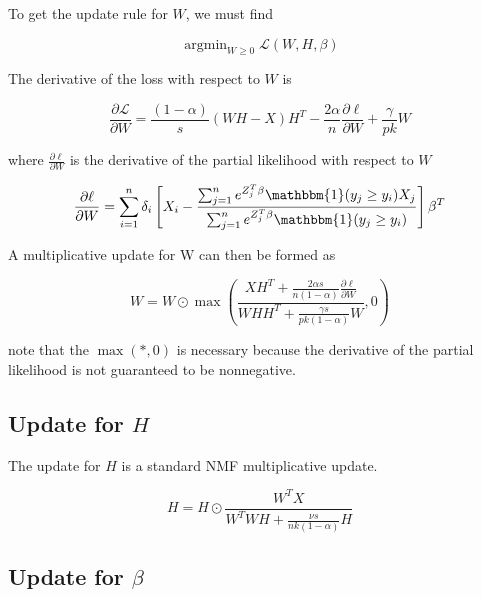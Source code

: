 \documentclass[9pt,twocolumn,twoside,]{pnas-new}
\begin{document}
To get the update rule for \(W\), we must find

\begin{equation}
    \mathop{\mathrm{argmin}}_{W \geq 0} \mathcal{L}(W,H,\beta)
\end{equation}

The derivative of the loss with respect to \(W\) is

\begin{equation}
        \frac{\partial \mathcal{L}}{\partial W} = \frac{(1-\alpha)}{s} (WH-X)H^T - \frac{2\alpha}{n}\frac{\partial \ell}{\partial W} + \frac{\gamma}{pk}W
\end{equation}

where \(\frac{\partial \ell}{\partial W}\) is the derivative of the
partial likelihood with respect to \(W\)

\begin{equation}
    \frac{\partial \ell}{\partial W} = \sum_{i=1}^n \delta_i \left[X_i - \frac{\sum_{j=1}^n e^{Z_j^T\beta} \mathbbm{1} (y_j \geq y_i)X_j}{\sum_{j=1}^n e^{Z_j^T\beta} \mathbbm{1} (y_j \geq y_i)} \right] \beta^T
\end{equation}

A multiplicative update for W can then be formed as

\begin{equation}
    W = W \odot \max\left(\frac{XH^T + \frac{2 \alpha s}{n(1-\alpha)} \frac{\partial \ell}{\partial W}}{WHH^T + \frac{\gamma s}{pk(1-\alpha)}W}, 0 \right)    
\end{equation}

note that the \(\max(*, 0)\) is necessary because the derivative of the
partial likelihood is not guaranteed to be nonnegative.

\subsection*{\texorpdfstring{Update for
\(H\)}{Update for H}}\label{update-for-h}

The update for \(H\) is a standard NMF multiplicative update.

\begin{equation}
        H = H \odot \frac{W^TX}{W^TWH + \frac{\nu s}{nk(1-\alpha)}H}
\end{equation}

\subsection*{\texorpdfstring{Update for
\(\beta\)}{Update for \textbackslash beta}}\label{update-for-beta}
\end{document}
